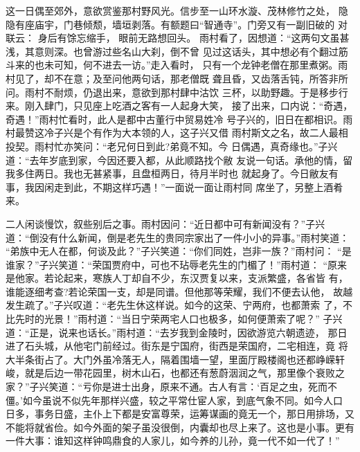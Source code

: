 这一日偶至郊外，意欲赏鉴那村野风光。信步至一山环水漩、茂林修竹之处，
隐隐有座庙宇，门巷倾颓，墙垣剥落。有额题曰“智通寺”。门旁又有一副旧破的
对联云：
身后有馀忘缩手，
眼前无路想回头。
雨村看了，因想道：“这两句文虽甚浅，其意则深。也曾游过些名山大刹，倒不曾
见过这话头，其中想必有个翻过筋斗来的也未可知，何不进去一访。”走入看时，
只有一个龙钟老僧在那里煮粥。雨村见了，却不在意；及至问他两句话，那老僧既
聋且昏，又齿落舌钝，所答非所问。雨村不耐烦，仍退出来，意欲到那村肆中沽饮
三杯，以助野趣。于是移步行来。刚入肆门，只见座上吃酒之客有一人起身大笑，
接了出来，口内说：“奇遇，奇遇！”雨村忙看时，此人是都中古董行中贸易姓冷
号子兴的，旧日在都相识。雨村最赞这冷子兴是个有作为大本领的人，这子兴又借
雨村斯文之名，故二人最相投契。雨村忙亦笑问：“老兄何日到此?弟竟不知。今
日偶遇，真奇缘也。”子兴道：“去年岁底到家，今因还要入都，从此顺路找个敝
友说一句话。承他的情，留我多住两日。我也无甚紧事，且盘桓两日，待月半时也
就起身了。今日敝友有事，我因闲走到此，不期这样巧遇！”一面说一面让雨村同
席坐了，另整上酒肴来。

二人闲谈慢饮，叙些别后之事。雨村因问：“近日都中可有新闻没有？”子兴
道：“倒没有什么新闻，倒是老先生的贵同宗家出了一件小小的异事。”雨村笑道：
“弟族中无人在都，何谈及此？”子兴笑道：“你们同姓，岂非一族？”雨村问：
“是谁家？”子兴笑道：“荣国贾府中，可也不玷辱老先生的门楣了！”雨村道：
“原来是他家。若论起来，寒族人丁却自不少，东汉贾复以来，支派繁盛，各省皆
有，谁能逐细考查?若论荣国一支，却是同谱。但他那等荣耀，我们不便去认他，
故越发生疏了。”子兴叹道：“老先生休这样说。如今的这荣、宁两府，也都萧索
了，不比先时的光景！”雨村道：“当日宁荣两宅人口也极多，如何便萧索了呢？”
子兴道：“正是，说来也话长。”雨村道：“去岁我到金陵时，因欲游览六朝遗迹，
那日进了石头城，从他宅门前经过。街东是宁国府，街西是荣国府，二宅相连，竟
将大半条街占了。大门外虽冷落无人，隔着围墙一望，里面厅殿楼阁也还都峥嵘轩
峻，就是后边一带花园里，树木山石，也都还有葱蔚洇润之气，那里像个衰败之
家？”子兴笑道：“亏你是进士出身，原来不通。古人有言：‘百足之虫，死而不
僵。’如今虽说不似先年那样兴盛，较之平常仕宦人家，到底气象不同。如今人口
日多，事务日盛，主仆上下都是安富尊荣，运筹谋画的竟无一个，那日用排场，又
不能将就省俭。如今外面的架子虽没很倒，内囊却也尽上来了。这也是小事。更有
一件大事：谁知这样钟鸣鼎食的人家儿，如今养的儿孙，竟一代不如一代了！”

